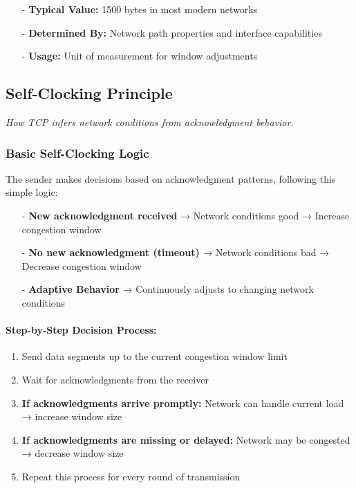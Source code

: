\documentclass[../../compsys.tex]{subfiles}
\begin{document}
\begin{itemize}
  \item[-] \textbf{Typical Value:} 1500 bytes in most modern networks
  \item[-] \textbf{Determined By:} Network path properties and interface capabilities
  \item[-] \textbf{Usage:} Unit of measurement for window adjustments
\end{itemize}

\subsection{Self-Clocking Principle}
\textit{How TCP infers network conditions from acknowledgment behavior.}

\subsubsection{Basic Self-Clocking Logic}
The sender makes decisions based on acknowledgment patterns, following this simple logic:

\begin{itemize}
  \item[-] \textbf{New acknowledgment received} → Network conditions good → Increase congestion window
  \item[-] \textbf{No new acknowledgment (timeout)} → Network conditions bad → Decrease congestion window
  \item[-] \textbf{Adaptive Behavior} → Continuously adjusts to changing network conditions
\end{itemize}

\paragraph{Step-by-Step Decision Process:}
\begin{enumerate}
  \item Send data segments up to the current congestion window limit
  \item Wait for acknowledgments from the receiver
  \item \textbf{If acknowledgments arrive promptly:} Network can handle current load → increase window size
  \item \textbf{If acknowledgments are missing or delayed:} Network may be congested → decrease window size
  \item Repeat this process for every round of transmission
\end{enumerate}
\end{document}
